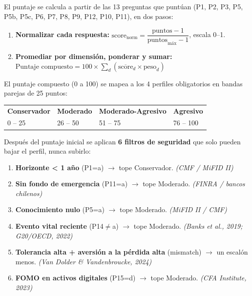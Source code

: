 \documentclass[11pt]{article}
\begin{document}
El puntaje se calcula a partir de las 13 preguntas que puntúan (P1, P2, P3, P5, P5b, P5c, P6, P7, P8, P9, P12, P10, P11), en dos pasos:

\begin{enumerate}[label=\textbf{Paso \arabic*.}]
  \item \textbf{Normalizar cada respuesta:} $\text{score}_{\text{norm}} = \dfrac{\text{puntos} - 1}{\text{puntos}_{\text{máx}} - 1}$, escala 0--1.
  \item \textbf{Promediar por dimensión, ponderar y sumar:} $\text{Puntaje compuesto} = 100 \times \displaystyle\sum_{d} \left(\overline{\text{score}}_d \times \text{peso}_d\right)$
\end{enumerate}

El puntaje compuesto (0 a 100) se mapea a los 4 perfiles obligatorios en bandas parejas de 25 puntos:

\begin{center}
\renewcommand{\arraystretch}{1.5}
\begin{tabular}{@{}p{3.5cm}p{3.5cm}p{3.5cm}p{3.5cm}@{}}
\toprule
\cellcolor{green!25}\textbf{Conservador} & \cellcolor{cyan!20}\textbf{Moderado} & \cellcolor{yellow!30}\textbf{Moderado-Agresivo} & \cellcolor{red!20}\textbf{Agresivo} \\
0 -- 25 & 26 -- 50 & 51 -- 75 & 76 -- 100 \\
\bottomrule
\end{tabular}
\end{center}

Después del puntaje inicial se aplican \textbf{6 filtros de seguridad} que solo pueden bajar el perfil, nunca subirlo:

\begin{enumerate}
  \item \textbf{Horizonte < 1 año} (P1=a) $\to$ tope Conservador. \textit{(CMF / MiFID II)}
  \item \textbf{Sin fondo de emergencia} (P11=a) $\to$ tope Moderado. \textit{(FINRA / bancos chilenos)}
  \item \textbf{Conocimiento nulo} (P5=a) $\to$ tope Moderado. \textit{(MiFID II / CMF)}
  \item \textbf{Evento vital reciente} (P14$\neq$a) $\to$ tope Moderado. \textit{(Banks et al., 2019; G20/OECD, 2022)}
  \item \textbf{Tolerancia alta + aversión a la pérdida alta} (mismatch) $\to$ un escalón menos. \textit{(Van Dolder \& Vandenbroucke, 2024)}
  \item \textbf{FOMO en activos digitales} (P15=d) $\to$ tope Moderado. \textit{(CFA Institute, 2023)}
\end{enumerate}
\end{document}
